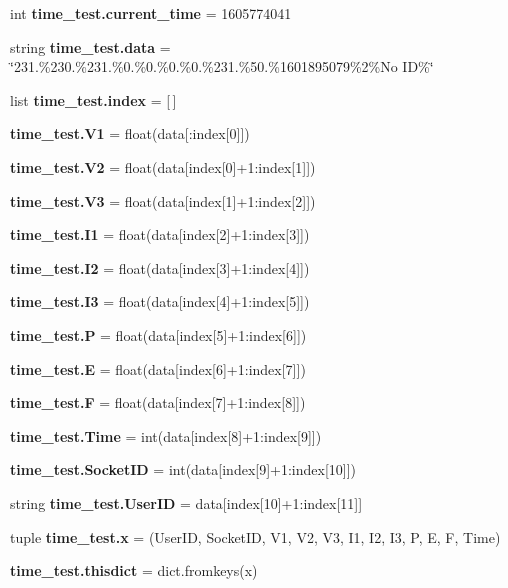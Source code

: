 \begin{DoxyCompactItemize}
\item 
int \textbf{ time\+\_\+test.\+current\+\_\+time} = 1605774041
\item 
string \textbf{ time\+\_\+test.\+data} = \char`\"{}231.\%230.\%231.\%0.\%0.\%0.\%0.\%231.\%50.\%1601895079\%2\%No ID\%\char`\"{}
\item 
list \textbf{ time\+\_\+test.\+index} = [$\,$]
\item 
\textbf{ time\+\_\+test.\+V1} = float(data[\+:index[0]])
\item 
\textbf{ time\+\_\+test.\+V2} = float(data[index[0]+1\+:index[1]])
\item 
\textbf{ time\+\_\+test.\+V3} = float(data[index[1]+1\+:index[2]])
\item 
\textbf{ time\+\_\+test.\+I1} = float(data[index[2]+1\+:index[3]])
\item 
\textbf{ time\+\_\+test.\+I2} = float(data[index[3]+1\+:index[4]])
\item 
\textbf{ time\+\_\+test.\+I3} = float(data[index[4]+1\+:index[5]])
\item 
\textbf{ time\+\_\+test.\+P} = float(data[index[5]+1\+:index[6]])
\item 
\textbf{ time\+\_\+test.\+E} = float(data[index[6]+1\+:index[7]])
\item 
\textbf{ time\+\_\+test.\+F} = float(data[index[7]+1\+:index[8]])
\item 
\textbf{ time\+\_\+test.\+Time} = int(data[index[8]+1\+:index[9]])
\item 
\textbf{ time\+\_\+test.\+Socket\+ID} = int(data[index[9]+1\+:index[10]])
\item 
string \textbf{ time\+\_\+test.\+User\+ID} = data[index[10]+1\+:index[11]]
\item 
tuple \textbf{ time\+\_\+test.\+x} = (\textquotesingle{}User\+ID\textquotesingle{}, \textquotesingle{}Socket\+ID\textquotesingle{}, \textquotesingle{}V1\textquotesingle{}, \textquotesingle{}V2\textquotesingle{}, \textquotesingle{}V3\textquotesingle{}, \textquotesingle{}I1\textquotesingle{}, \textquotesingle{}I2\textquotesingle{}, \textquotesingle{}I3\textquotesingle{}, \textquotesingle{}P\textquotesingle{}, \textquotesingle{}E\textquotesingle{}, \textquotesingle{}F\textquotesingle{}, \textquotesingle{}Time\textquotesingle{})
\item 
\textbf{ time\+\_\+test.\+thisdict} = dict.\+fromkeys(x)
\end{DoxyCompactItemize}
